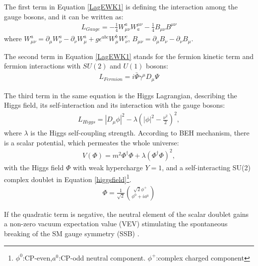 The first term in Equation \ref{LagEWK1} is defining the interaction among the gauge bosons, and it can be written as:
\begin{eqnarray}
\label{Laggauge1}
{L_{Gauge} = -\frac{1}{4}W_{\mu\nu}^aW^{\mu\nu}_a -\frac{1}{4}B_{\mu\nu}B^{\mu\nu} }
\end{eqnarray}
where $W_{\mu\nu}^a = \partial_{\mu}W_{\nu}^a - \partial_{\nu}W_{\mu}^a + g\epsilon^{abc}W_{\mu}^bW_{\nu}^c$,
 $B_{\mu\nu} = \partial_{\mu}B_{\nu} - \partial_{\nu}B_{\mu}$.

The second term in Equation \ref{LagEWK1} stands for the fermion kinetic term and fermion interactions with $SU(2)$ and $U(1)$ bosons:
\begin{eqnarray}
\label{Lagfermions1}
{L_{Fermion} = i\bar{\Psi}\gamma^{\mu}D_{\mu}\Psi}
\end{eqnarray}

The third term in the same equation is the Higgs Lagrangian, describing the Higgs field, its self-interaction and its interaction with the gauge bosons:
\begin{eqnarray}
\label{LagHiggs1}
{L_{Higgs} = |D_{\mu}\phi|^2 - \lambda(|\phi|^2 - \frac{\nu^2}{2})^2},
\end{eqnarray}
where $\lambda$ is the Higgs self-coupling strength. %
According to BEH mechanism, there is a scalar potential, which permeates the whole universe: 
\begin{eqnarray}
\label{higgspot}
	{V(\Phi)}= {m^2\Phi^{\dagger}\Phi+\lambda(\Phi^{\dagger}\Phi)^2},
\end{eqnarray}
with the Higgs field $\Phi$ with weak hypercharge $Y =1$, and a self-interacting SU(2) complex doublet in Equation \ref{higgsfield}\footnote{$\phi^0$:CP-even,$a^0$:CP-odd neutral component. $\phi^+$:complex charged component}.
\begin{eqnarray}
\label{higgsfield}
	{\Phi}= {\frac{1}{\sqrt2}}{\sqrt2\phi^{+}  \choose \phi^0 + ia^0 }
\end{eqnarray}

If the quadratic term is negative, the neutral element of the scalar doublet gains a non-zero vacuum expectation value (VEV) stimulating the spontaneous breaking of the SM gauge symmetry (SSB) \cite{Olive:2016xmw}.

